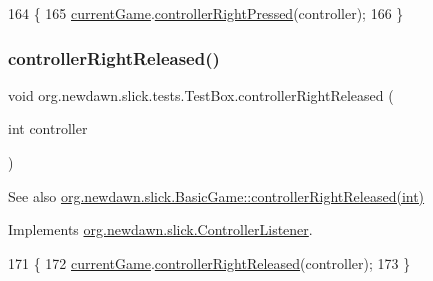\begin{DoxyCode}
164                                                        \{
165         \mbox{\hyperlink{classorg_1_1newdawn_1_1slick_1_1tests_1_1_test_box_a5e0fdb2f97173d828af597044c525078}{currentGame}}.\mbox{\hyperlink{classorg_1_1newdawn_1_1slick_1_1_basic_game_a8c225d55800c95a5b339468d08fcf48c}{controllerRightPressed}}(controller);
166     \}
\end{DoxyCode}
\mbox{\label{classorg_1_1newdawn_1_1slick_1_1tests_1_1_test_box_ac2e44af6fd71d4435f7d9ef1d2db582e}} 
\subsubsection{\texorpdfstring{controller\+Right\+Released()}{controllerRightReleased()}}
{\footnotesize\ttfamily void org.\+newdawn.\+slick.\+tests.\+Test\+Box.\+controller\+Right\+Released (\begin{DoxyParamCaption}\item[{int}]{controller }\end{DoxyParamCaption})\hspace{0.3cm}{\ttfamily [inline]}}

\begin{DoxySeeAlso}{See also}
\mbox{\hyperlink{classorg_1_1newdawn_1_1slick_1_1_basic_game_a84adeb6342b970209d965415b8d23162}{org.\+newdawn.\+slick.\+Basic\+Game\+::controller\+Right\+Released(int)}} 
\end{DoxySeeAlso}


Implements \mbox{\hyperlink{interfaceorg_1_1newdawn_1_1slick_1_1_controller_listener_a33ee418e010e69783169b3f52fb62c3b}{org.\+newdawn.\+slick.\+Controller\+Listener}}.


\begin{DoxyCode}
171                                                         \{
172         \mbox{\hyperlink{classorg_1_1newdawn_1_1slick_1_1tests_1_1_test_box_a5e0fdb2f97173d828af597044c525078}{currentGame}}.\mbox{\hyperlink{classorg_1_1newdawn_1_1slick_1_1_basic_game_a84adeb6342b970209d965415b8d23162}{controllerRightReleased}}(controller);
173     \}
\end{DoxyCode}
\mbox{\label{classorg_1_1newdawn_1_1slick_1_1tests_1_1_test_box_a3d43a20b538fd2f3331742cd26466274}} 
